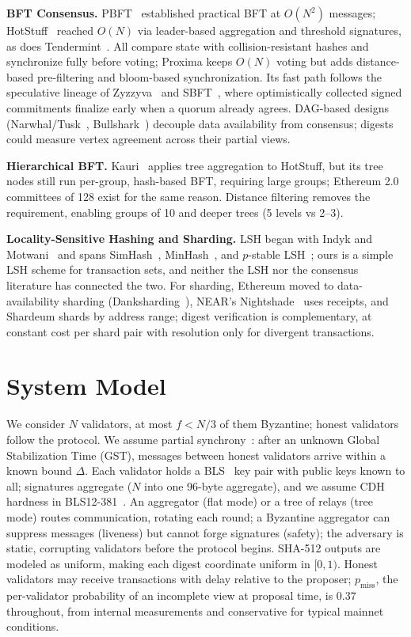 \documentclass[runningheads]{llncs}
\begin{document}
\textbf{BFT Consensus.} PBFT~\cite{castro1999pbft} established practical BFT at $O(N^2)$ messages; HotStuff~\cite{yin2019hotstuff} reached $O(N)$ via leader-based aggregation and threshold signatures, as does Tendermint~\cite{buchman2016tendermint}. All compare state with collision-resistant hashes and synchronize fully before voting; Proxima keeps $O(N)$ voting but adds distance-based pre-filtering and bloom-based synchronization. Its fast path follows the speculative lineage of Zyzzyva~\cite{kotla2007zyzzyva} and SBFT~\cite{gueta2019sbft}, where optimistically collected signed commitments finalize early when a quorum already agrees. DAG-based designs (Narwhal/Tusk~\cite{narwhal}, Bullshark~\cite{bullshark}) decouple data availability from consensus; digests could measure vertex agreement across their partial views.

\textbf{Hierarchical BFT.} Kauri~\cite{kauri} applies tree aggregation to HotStuff, but its tree nodes still run per-group, hash-based BFT, requiring large groups; Ethereum 2.0~\cite{eth2spec} committees of 128 exist for the same reason. Distance filtering removes the requirement, enabling groups of 10 and deeper trees (5 levels vs 2--3).

\textbf{Locality-Sensitive Hashing and Sharding.} LSH began with Indyk and Motwani~\cite{indyk1998lsh} and spans SimHash~\cite{simhash}, MinHash~\cite{minhash}, and $p$-stable LSH~\cite{pstable}; ours is a simple LSH scheme for transaction sets, and neither the LSH nor the consensus literature has connected the two. For sharding, Ethereum moved to data-availability sharding (Danksharding~\cite{danksharding}), NEAR's Nightshade~\cite{nightshade} uses receipts, and Shardeum shards by address range; digest verification is complementary, at constant cost per shard pair with resolution only for divergent transactions.

\section{System Model}
\label{sec:model}

We consider $N$ validators, at most $f < N/3$ of them Byzantine; honest validators follow the protocol. We assume partial synchrony~\cite{dwork1988partialsync}: after an unknown Global Stabilization Time (GST), messages between honest validators arrive within a known bound $\Delta$. Each validator holds a BLS~\cite{boneh2004bls} key pair with public keys known to all; signatures aggregate ($N$ into one 96-byte aggregate), and we assume CDH hardness in BLS12-381~\cite{blst}. An aggregator (flat mode) or a tree of relays (tree mode) routes communication, rotating each round; a Byzantine aggregator can suppress messages (liveness) but cannot forge signatures (safety); the adversary is static, corrupting validators before the protocol begins. SHA-512 outputs are modeled as uniform, making each digest coordinate uniform in $[0,1)$. Honest validators may receive transactions with delay relative to the proposer; $p_{\mathrm{miss}}$, the per-validator probability of an incomplete view at proposal time, is $0.37$ throughout, from internal measurements and conservative for typical mainnet conditions.
\end{document}
